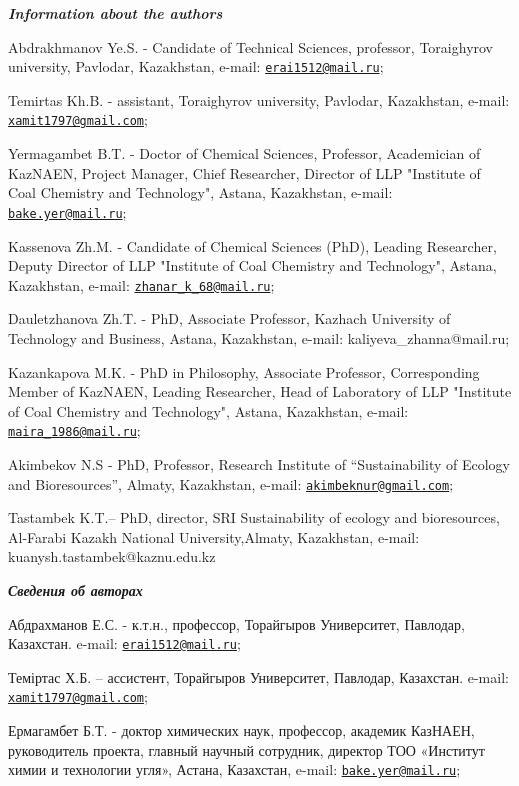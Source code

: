 \begin{authorinfo}
\emph{{\bfseries Information about the authors}}

Abdrakhmanov Ye.S. - Candidate of Technical Sciences, professor,
Toraighyrov university, Pavlodar, Kazakhstan, e-mail:
\href{mailto:erai1512@mail.ru}{\nolinkurl{erai1512@mail.ru}};

Temirtas Kh.B. - assistant, Toraighyrov university, Pavlodar,
Kazakhstan, e-mail:
\href{mailto:xamit1797@gmail.com}{\nolinkurl{xamit1797@gmail.com}};

Yermagambet B.T. - Doctor of Chemical Sciences, Professor, Academician
of KazNAEN, Project Manager, Chief Researcher, Director of LLP
"Institute of Coal Chemistry and Technology", Astana, Kazakhstan,
e-mail: \href{mailto:bake.yer@mail.ru}{\nolinkurl{bake.yer@mail.ru}};

Kassenova Zh.M. - Candidate of Chemical Sciences (PhD), Leading
Researcher, Deputy Director of LLP "Institute of Coal Chemistry and
Technology", Astana, Kazakhstan, e-mail:
\href{mailto:zhanar_k_68@mail.ru}{\nolinkurl{zhanar\_k\_68@mail.ru}};

Dauletzhanova Zh.T. - PhD, Associate Professor, Kazhach University of
Technology and Business, Astana, Kazakhstan, e-mail:
kaliyeva\_zhanna@mail.ru;

Kazankapova M.K. - PhD in Philosophy, Associate Professor, Corresponding
Member of KazNAEN, Leading Researcher, Head of Laboratory of LLP
"Institute of Coal Chemistry and Technology", Astana, Kazakhstan,
e-mail:
\href{mailto:maira_1986@mail.ru}{\nolinkurl{maira\_1986@mail.ru}};

Akimbekov N.S - PhD, Professor, Research Institute of ``Sustainability
of Ecology and Bioresources'', Almaty, Kazakhstan, e-mail:
\href{mailto:akimbeknur@gmail.com}{\nolinkurl{akimbeknur@gmail.com}};

Tastambek K.T.-- PhD, director, SRI Sustainability of ecology and
bioresources, Al-Farabi Kazakh National University,Almaty, Kazakhstan,
e-mail: kuanysh.tastambek@kaznu.edu.kz

\emph{{\bfseries Сведения об авторах}}

Абдрахманов Е.С. - к.т.н., профессор, Торайгыров Университет, Павлодар,
Казахстан. e-mail:
\href{mailto:erai1512@mail.ru}{\nolinkurl{erai1512@mail.ru}};

Теміртас Х.Б. -- ассистент, Торайгыров Университет, Павлодар, Казахстан.
e-mail:
\href{mailto:xamit1797@gmail.com}{\nolinkurl{xamit1797@gmail.com}};

Ермагамбет Б.Т. - доктор химических наук, профессор, академик КазНАЕН,
руководитель проекта, главный научный сотрудник, директор ТОО «Институт
химии и технологии угля», Астана, Казахстан, e-mail:
\href{mailto:bake.yer@mail.ru}{\nolinkurl{bake.yer@mail.ru}};


\end{authorinfo}
